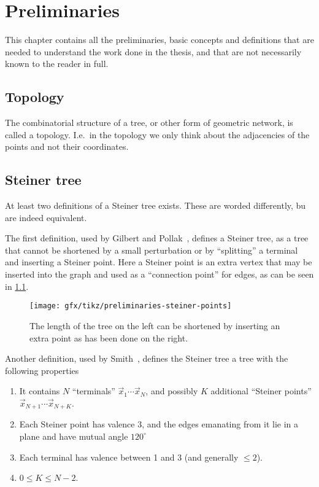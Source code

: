 {
\abnormalparskip{0pt}
\chapter{Preliminaries}
\label{cha:preliminaries}
}

This chapter contains all the preliminaries, basic concepts and definitions
that are needed to understand the work done in the thesis, and that are
not necessarily known to the reader in full.


\section{Topology}
\label{sec:topology}

The combinatorial structure of a tree, or other form of geometric network, is
called a topology.  I.e.\ in the topology we only think about the adjacencies of
the points and not their coordinates.

\section{Steiner tree}
\label{sec:steiner-tree}

At least two definitions of a Steiner tree exists.  These are worded
differently, bu are indeed equivalent.

The first definition, used by Gilbert and Pollak~\cite{Gilbert1968}, defines a
Steiner tree, as a tree that cannot be shortened by a small perturbation or by
``splitting'' a terminal and inserting a Steiner point.  Here a Steiner point is
an extra vertex that may be inserted into the graph and used as a ``connection
point'' for edges, as can be seen in \cref{fig:preliminaries-steiner-point}.

\begin{figure}[htbp]
\centering
\texttt{[image: gfx/tikz/preliminaries-steiner-points]}
\caption[Steiner point of isosceles triangle.]{The length of the tree on the left
  can be shortened by inserting an extra point as has been done on the
  right.\label{fig:preliminaries-steiner-point}}
\end{figure}

Another definition, used by Smith~\cite{Smith1992}, defines the Steiner tree a
tree with the following properties

\begin{enumerate}
\item It contains $N$ ``terminals'' $\vec{x}_1 \cdots \vec{x}_N$, and
  possibly $K$ additional ``Steiner points'' $\vec{x}_{N+1} \cdots
  \vec{x}_{N+K}$.
\item Each Steiner point has valence 3, and the edges emanating from it lie in a
  plane and have mutual angle $120^{\circ}$
\item Each terminal has valence between 1 and 3 (and generally $\le 2$).
\item $0 \le K \le N-2$.
\end{enumerate}

